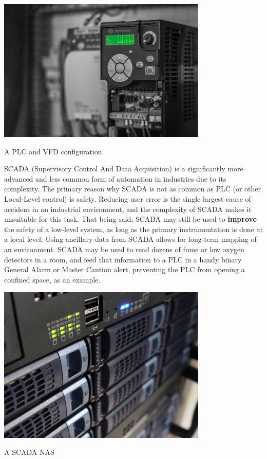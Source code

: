 \documentclass[11pt,a4paper]{article}
\begin{document}
\begin{center}
\includegraphics[width=10cm]{plcdrive.jpg}\par
A PLC and VFD configuration
\end{center}

SCADA (Supervisory Control And Data Acquisition) is a significantly more advanced and less common form of automation in industries due to its complexity. The primary reason why SCADA is not as common as PLC (or other Local-Level control) is safety. Reducing user error is the single largest cause of accident in an industrial environment, and the complexity of SCADA makes it unsuitable for this task. That being said, SCADA may still be used to \textbf{improve} the safety of a low-level system, as long as the primary instrumentation is done at a local level. Using ancillary data from SCADA allows for long-term mapping of an environment. SCADA may be used to read dozens of fume or low oxygen detectors in a room, and feed that information to a PLC in a handy binary General Alarm or Master Caution alert, preventing the PLC from opening a confined space, as an example.
\begin{center}
\includegraphics[width=10cm]{scada.jpg}\par
A SCADA NAS
\end{center}
\end{document}

